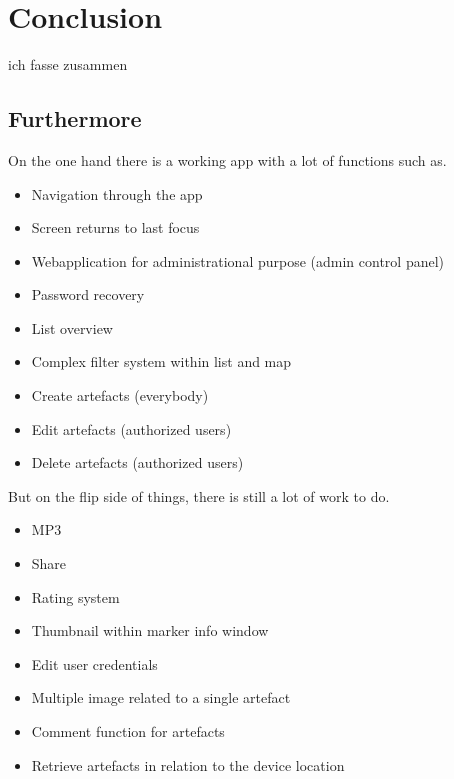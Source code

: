 \newpage
\chapter{Conclusion}\label{cap:Conclusion}
ich fasse zusammen
\section{Furthermore}
On the one hand there is a working app with a lot of functions such as. 
\begin{itemize}
\item Navigation through the app
\item Screen returns to last focus
\item Webapplication for administrational purpose (admin control panel)
\item Password recovery
\item List overview
\item Complex filter system within list and map
\item Create artefacts (everybody)
\item Edit artefacts (authorized users)
\item Delete artefacts (authorized users)
\end{itemize}
But on the flip side of things, there is still a lot of work to do.
\begin{itemize}
\item MP3
\item Share
\item Rating system
\item Thumbnail within marker info window
\item Edit user credentials
\item Multiple image related to a single artefact
\item Comment function for artefacts
\item Retrieve artefacts in relation to the device location

\end{itemize}